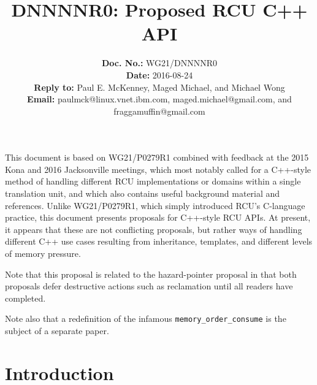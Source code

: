 \documentclass[letterpaper,twocolumn,10pt]{article}
\begin{document}
\newcommand{\co}[1]{\lstinline[breaklines=yes,breakatwhitespace=yes]{#1}}

\title{DNNNNR0: Proposed RCU C++ API}

\author{
{\bf Doc. No.: } WG21/DNNNNR0 \\
{\bf Date: } 2016-08-24 \\
{\bf Reply to: } Paul E. McKenney, Maged Michael, and Michael Wong \\
{\bf Email: } paulmck@linux.vnet.ibm.com, maged.michael@gmail.com, and
fraggamuffin@gmail.com
} %


\pagestyle{myheadings}

\maketitle


This document is based on WG21/P0279R1 combined with feedback at
the 2015 Kona and 2016 Jacksonville meetings, which most notably called
for a C++-style method of handling different RCU implementations or
domains within a single translation unit, and which also contains
useful background material and references.
Unlike WG21/P0279R1, which simply introduced RCU's C-language practice,
this document presents proposals for C++-style RCU APIs.
At present, it appears that these are not conflicting proposals, but
rather ways of handling different C++ use cases resulting from
inheritance, templates, and different levels of memory pressure.

Note that this proposal is related to the hazard-pointer proposal in
that both proposals defer destructive actions such as reclamation until
all readers have completed.

Note also that a redefinition of the infamous \co{memory_order_consume}
is the subject of a separate paper.

\section{Introduction}
\label{sec:Introduction}
\end{document}
